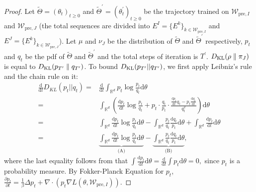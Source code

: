 \begin{proof}
	Let $\widetilde{\Theta}=(\theta_t)_{t\geq 0}$ and $\widetilde{\Theta}^\prime=(\theta_t^\prime)_{t\geq 0}$ be the trajectory trained on $\mathcal{W}_{\text{pre},I}$ and $\mathcal{W}_{\text{pre},J}$ (the total sequences are divided into $E^I=\{E^k\}_{k \in \mathcal{W}_{\text{pre},I}}$ and $E^J=\{E^k\}_{k \in \mathcal{W}_{\text{pre},J}}$). Let $\mu$ and $\nu_J$ be the distribution of $\widetilde{\Theta}$ and $\widetilde{\Theta}^\prime$ respectively, $p_t$ and $q_t$ be the pdf of $\widetilde{\Theta}$ and $\widetilde{\Theta}^\prime$ and the total steps of iteration is $T^\prime$. $D_{\mathrm{KL}}(\rho \parallel \pi_J)$ is equal to $D_{\mathrm{KL}}(p_{T^\prime}\parallel q_{T^\prime})$. To bound $D_{\mathrm{KL}}(p_{T^\prime}||q_{T^\prime})$, we first apply Leibniz’s rule and the chain rule on it:
	$$
	\begin{aligned}
		\frac{\mathrm{d}}{\mathrm{d}t}D_{KL}(p_t||q_t)
		=&\frac{\mathrm{d}}{\mathrm{d}t}\int_{\mathbb{R}^d}p_t\operatorname{log}\frac{p_t}{q_t}\mathrm{d}\theta \\
		=& \int_{\mathbb{R}^d} (\frac{\mathrm{d}p_t}{\mathrm{d}t}\operatorname{log}\frac{p_t}{q_t}+p_t\cdot \frac{q_t}{p_t}\cdot \frac{\frac{\mathrm{d}p_t}{\mathrm{d}t}q_t-p_t\frac{\mathrm{d}q_t}{\mathrm{d}t}}{q_t^2})\mathrm{d}\theta \\
		=& \int_{\mathbb{R}^d} \frac{\mathrm{d}p_t}{\mathrm{d}t}\operatorname{log}\frac{p_t}{q_t}\mathrm{d}\theta - \int_{\mathbb{R}^d} \frac{p_t}{q_t}\frac{\mathrm{d}q_t}{p_t}\mathrm{d}\theta + \int_{\mathbb{R}^d} \frac{\mathrm{d}p_t}{\mathrm{d}t}\mathrm{d}\theta \\
		=& \underbrace{\int_{\mathbb{R}^d} \frac{\mathrm{d}p_t}{\mathrm{d}t}\operatorname{log}\frac{p_t}{q_t}\mathrm{d}\theta}_{\text{(A)}} - \underbrace{\int_{\mathbb{R}^d} \frac{p_t}{q_t}\frac{\mathrm{d}q_t}{p_t}\mathrm{d}\theta}_{\text{(B)}},
	\end{aligned}
	$$
	where the last equality follows from that $\int \frac{\mathrm{d}p_t}{\mathrm{d}t}\mathrm{d}\theta = \frac{\mathrm{d}}{\mathrm{d}t} \int p_t\mathrm{d}\theta = 0,$ since $p_t$ is a probability measure.
	By Fokker-Planck Equation for $p_t$, $\frac{\partial p_t}{\partial t} = \frac1\beta\Delta p_t+\nabla \cdot(p_t \nabla L(\theta, \mathcal{W}_{\text{pre},I}))$.
	

\end{proof}
